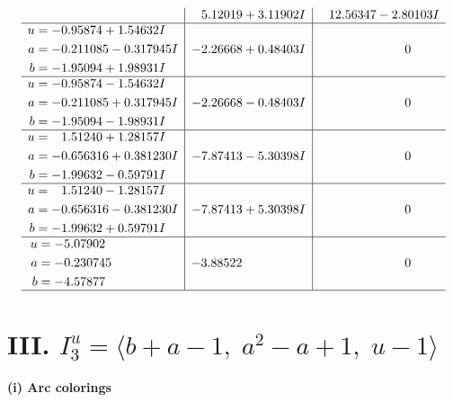 \documentclass[1p]{elsarticle_modified}
\theoremstyle{definition}
\begin{document}
$$\begin{array}{c|c|c}
 & \phantom{-}5.12019 + 3.11902 I & \phantom{-}12.56347 - 2.80103 I \\ \hline\begin{aligned}
u &= -0.95874 + 1.54632 I \\
a &= -0.211085 - 0.317945 I \\
b &= -1.95094 + 1.98931 I\end{aligned}
 & -2.26668 + 0.48403 I & \phantom{-0.000000 } 0 \\ \hline\begin{aligned}
u &= -0.95874 - 1.54632 I \\
a &= -0.211085 + 0.317945 I \\
b &= -1.95094 - 1.98931 I\end{aligned}
 & -2.26668 - 0.48403 I & \phantom{-0.000000 } 0 \\ \hline\begin{aligned}
u &= \phantom{-}1.51240 + 1.28157 I \\
a &= -0.656316 + 0.381230 I \\
b &= -1.99632 - 0.59791 I\end{aligned}
 & -7.87413 - 5.30398 I & \phantom{-0.000000 } 0 \\ \hline\begin{aligned}
u &= \phantom{-}1.51240 - 1.28157 I \\
a &= -0.656316 - 0.381230 I \\
b &= -1.99632 + 0.59791 I\end{aligned}
 & -7.87413 + 5.30398 I & \phantom{-0.000000 } 0 \\ \hline\begin{aligned}
u &= -5.07902\phantom{ +0.000000I} \\
a &= -0.230745\phantom{ +0.000000I} \\
b &= -4.57877\phantom{ +0.000000I}\end{aligned}
 & -3.88522\phantom{ +0.000000I} & \phantom{-0.000000 } 0\\
 \hline 
 \end{array}$$\newpage\newpage\renewcommand{\arraystretch}{1}
\centering \section*{III. $I^u_{3}= \langle b+a-1,\;a^2- a+1,\;u-1 \rangle$}
\flushleft \textbf{(i) Arc colorings}\\
\end{document}
